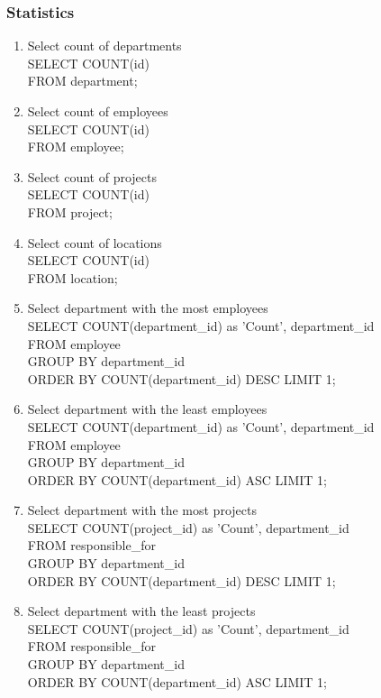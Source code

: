 \documentclass[11pt,letterpaper]{article}
\begin{document}
	\subsubsection{Statistics}
	\begin{enumerate}
		\item Select count of departments \\SELECT COUNT(id) \\FROM department;
		\item Select count of employees \\SELECT COUNT(id) \\FROM employee;
		\item Select count of projects \\SELECT COUNT(id) \\FROM project; 
		\item Select count of locations \\SELECT COUNT(id) \\FROM location;
		\item Select department with the most employees \\SELECT COUNT(department\_id) as 'Count', department\_id \\FROM employee \\GROUP BY department\_id \\ORDER BY COUNT(department\_id) DESC LIMIT 1;
		\item Select department with the least employees \\SELECT COUNT(department\_id) as 'Count', department\_id \\FROM employee \\GROUP BY department\_id \\ORDER BY COUNT(department\_id) ASC LIMIT 1;
	\pagebreak
		\item Select department with the most projects \\SELECT COUNT(project\_id) as 'Count', department\_id \\FROM responsible\_for \\GROUP BY department\_id \\ORDER BY COUNT(department\_id) DESC LIMIT 1;
		\item Select department with the least projects \\SELECT COUNT(project\_id) as 'Count', department\_id \\FROM responsible\_for \\GROUP BY department\_id \\ORDER BY COUNT(department\_id) ASC LIMIT 1;

\end{enumerate}
\end{document}
